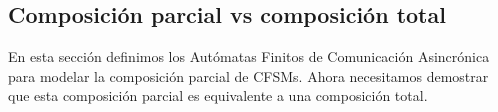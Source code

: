 






\subsection{Composición parcial vs composición total}
En esta sección definimos los Autómatas Finitos de Comunicación Asincrónica para modelar la composición parcial de CFSMs. Ahora necesitamos demostrar que esta composición parcial es equivalente a una composición total.

